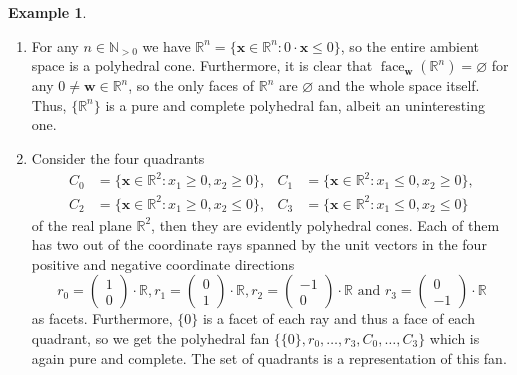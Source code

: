 \documentclass[
  paper=a4,
  titlepage,
  bibliography=totoc,
  pagesize=pdftex
]{scrartcl}
\numberwithin{figure}{section}
\numberwithin{equation}{section}
\numberwithin{table}{section}
\newcommand*\setR{\mathds{R}}
\newcommand*\setN{\mathds{N}}
\newcommand*\vectRR[2]{\begin{pmatrix} #1 \\ #2 \end{pmatrix}}
\let\vec\mathbf
\DeclareMathOperator{\face}{face}
\theoremstyle{definition}
\newtheorem{example}[definition]{Example}
\numberwithin{definition}{section}
\begin{document}
\begin{example}\
  \begin{enumerate}
    \item For any $n \in \setN_{>0}$ we have $\setR^n = \{ \vec x \in \setR^n : 0 \cdot
      \vec x \leq 0 \}$, so the entire ambient space is a polyhedral cone. Furthermore, it
      is clear that $\face_{\vec w}(\setR^n) = \varnothing$ for any $0\neq\vec w \in
      \setR^n$, so the only faces of $\setR^n$ are $\varnothing$ and the whole space
      itself. Thus, $\{ \setR^n\}$ is a pure and complete polyhedral fan, albeit an
      uninteresting one.
    \item Consider the four quadrants
      \begin{align*}
        C_0 &= \{ \vec x \in \setR^2 : x_1 \geq 0, x_2 \geq 0 \}, &
        C_1 &= \{ \vec x \in \setR^2 : x_1 \leq 0, x_2 \geq 0 \}, \\
        C_2 &= \{ \vec x \in \setR^2 : x_1 \geq 0, x_2 \leq 0 \}, &
        C_3 &= \{ \vec x \in \setR^2 : x_1 \leq 0, x_2 \leq 0 \}
      \end{align*}
      of the real plane $\setR^2$, then they are evidently polyhedral cones. Each of them
      has two out of the coordinate rays spanned by the unit vectors in the four positive
      and negative coordinate directions
      \[
        r_0 = \vectRR10 \cdot \setR,
        r_1 = \vectRR01 \cdot \setR,
        r_2 = \vectRR{-1}0 \cdot \setR
        \text{ and }
        r_3 = \vectRR0{-1} \cdot \setR
      \]
      as facets. Furthermore, $\{0\}$ is a facet of each ray and thus a face of each
      quadrant, so we get the polyhedral fan $\{ \{0\}, r_0, \dots, r_3, C_0, \dots, C_3
      \}$ which is again pure and complete. The set of quadrants is a representation of
      this fan.
  \end{enumerate}
\end{example}
\end{document}
